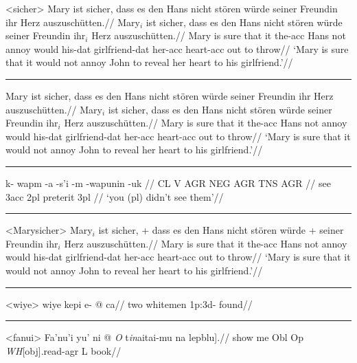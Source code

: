 \documentclass[12pt]{article}
\begin{document}
\begingroup
\ex<sicher>
\begingl
\glpreamble Mary ist sicher, dass es den Hans nicht st\"oren w\"urde
seiner Freundin ihr Herz auszusch\"utten.//
\gla Mary$_i$ ist sicher, dass es den Hans nicht st\"oren w\"urde
seiner Freundin ihr$_i$ Herz auszusch\"utten.//
\glb Mary is sure that it the-{\sc acc} Hans not annoy would
his-{\sc dat} girlfriend-{\sc dat} her-{\sc acc} heart-{\sc acc} {out to
throw}//
\glft  `Mary is sure that it would not annoy John to reveal her
heart to his girlfriend.'//
\endgl
\xe
\endgroup
\bigskip

\filbreak\hrule\medskip

\begingroup
\ex
\hsize=4in
\begingl
\glpreamble Mary ist sicher, dass es den Hans nicht st\"oren w\"urde
seiner Freundin ihr Herz auszusch\"utten.//
\gla Mary$_i$ ist sicher, dass es den Hans nicht st\"oren w\"urde
seiner Freundin ihr$_i$ Herz auszusch\"utten.//
\glb Mary is sure that it the-{\sc acc} Hans not annoy would
his-{\sc dat} girlfriend-{\sc dat} her-{\sc acc} heart-{\sc acc} {out to
throw}//
\glft  `Mary is sure that it would not annoy John to reveal her
heart to his girlfriend.'//
\endgl
\xe
\endgroup
\bigskip

\filbreak\hrule\medskip

\begingroup
{}
\begingl
\gla k- wapm -a -s'i -m -wapunin -uk //
\glb CL V AGR NEG AGR TNS AGR //
 see {\sc 3acc} {} {\sc 2pl} preterit {\sc 3pl} //
\glft `you (pl) didn't see them'//
\endgl
\xe
\endgroup
\bigskip

\filbreak\hrule\medskip

\begingroup
\ex<Marysicher>
\begingl
\gla Mary$_i$ ist sicher, + dass es den Hans nicht st\"oren w\"urde
+ seiner Freundin ihr$_i$ Herz auszusch\"utten.//
\glb Mary is sure that it the-{\sc acc} Hans not annoy would
his-{\sc dat} girlfriend-{\sc dat} her-{\sc acc} heart-{\sc acc} {out to
throw}//
\glft  `Mary is sure that it would not annoy John to reveal her
heart to his girlfriend.'//
\endgl
\xe
\endgroup
\bigskip

\filbreak\hrule\medskip

\begingroup
\ex<wiye>
\begingl
\gla wiye kepi e- @ ca//
\glb two whitemen {\sc 1p:3d}- found//
\endgl
\xe
\endgroup
\bigskip

\filbreak\hrule\medskip

\begingroup
\ex[everygla=,glhangstyle=normal]<fanui>
\begingl
\gla Fa'nu'i yu' ni \nogloss{[[} @ {\it O} t{\it in\/}aitai-mu
\nogloss{{\it t\/}]} na {lepblu].}//
\glb show me Obl Op {\it WH\/}[obj].read-agr L book//
\endgl
\xe
\endgroup
\bigskip
\end{document}
